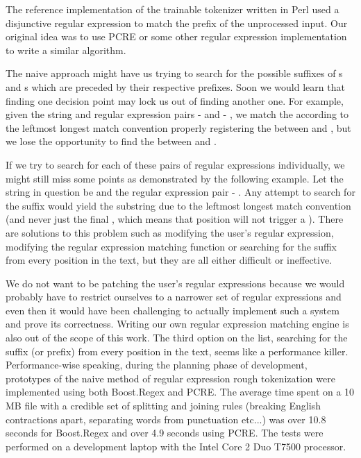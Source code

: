 The reference implementation of the trainable tokenizer written in Perl used a
disjunctive regular expression to match the prefix of the unprocessed input.
Our original idea was to use PCRE \cite{web-pcre} or some other regular expression
implementation \cite{web-boost,web-re2} to write a similar algorithm.

The naive approach might have us trying to search for the possible suffixes of
\mayjoin{}s and \maysplit{}s which are preceded by their respective prefixes.
Soon we would learn that finding one decision point may lock us out of finding
another one. For example, given the string  and \maysplit{}
regular expression pairs  -  and  -
, we match the  according to the leftmost longest match
convention properly registering the \maysplit{} between  and
, but we lose the opportunity to find the \maysplit{} between
 and .

If we try to search for each of these pairs of regular expressions
individually, we might still miss some points as demonstrated by the following
example. Let the string in question be  and the \maysplit{}
regular expression pair  - . Any attempt to search
for the suffix  would yield the  substring due to
the leftmost longest match convention (and never just the final ,
which means that position will not trigger a \maysplit). There are solutions to
this problem such as modifying the user's regular expression, modifying the
regular expression matching function or searching for the suffix from every
position in the text, but they are all either difficult or ineffective.

We do not want to be patching the user's regular expressions because we would
probably have to restrict ourselves to a narrower set of regular expressions
and even then it would have been challenging to actually implement such a system
and prove its correctness. Writing our own regular expression matching engine
is also out of the scope of this work. The third option on the list, searching
for the suffix (or prefix) from every position in the text, seems like a
performance killer. Performance-wise speaking, during the planning phase of
development, prototypes of the naive method of regular expression rough
tokenization were implemented using both Boost.Regex and PCRE. The average
time spent on a 10 MB file with a credible set of splitting and joining rules
(breaking English contractions apart, separating words from punctuation
etc...) was over 10.8 seconds for Boost.Regex and over 4.9 seconds using
PCRE. The tests were performed on a development laptop with the Intel Core 2
Duo T7500 processor.

